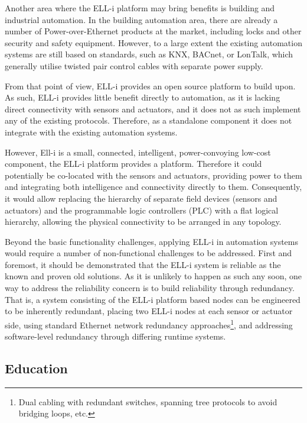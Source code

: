 \documentclass[draft,a4paper]{siamltex}
\begin{document}
Another area where the ELL-i platform may bring benefits is building
and industrial automation.  In the building automation area, there are
already a number of Power-over-Ethernet products at the market,
including locks and other security and safety equipment.  However, to
a large extent the existing automation systems are still based on
standards, such as KNX\cite{KNX}, BACnet\cite{BACnet}, or
LonTalk\cite{LonTalk}, which generally utilise twisted pair
control cables with separate power supply.

From that point of view, ELL-i provides an open source platform to
build upon.  As such, ELL-i provides little benefit directly to
automation, as it is lacking direct connectivity with sensors and
actuators, and it does not as such implement any of the existing
protocols.  Therefore, as a standalone component it does not integrate
with the existing automation systems.

However, Ell-i is a small, connected, intelligent, power-convoying low-cost
component, the ELL-i platform provides a platform.  Therefore it could
potentially be co-located with the sensors and actuators, providing
power to them and integrating both intelligence and connectivity
directly to them.  Consequently, it would allow replacing the
hierarchy of separate field devices (sensors and actuators) and the
programmable logic controllers (PLC) with a flat logical hierarchy,
allowing the physical connectivity to be arranged in any topology.

Beyond the basic functionality challenges, applying ELL-i in
automation systems would require a number of non-functional challenges
to be addressed.  First and foremost, it should be demonstrated that
the ELL-i system is reliable as the known and proven old solutions.
As it is unlikely to happen as such any soon, one way to address the
reliability concern is to build reliability through redundancy.  That
is, a system consisting of the ELL-i platform based nodes can be
engineered to be inherently redundant, placing two ELL-i nodes at each
sensor or actuator side, using standard Ethernet network redundancy
approaches\footnote{Dual cabling with redundant switches, spanning
  tree protocols to avoid bridging loops, etc.}, and addressing
software-level redundancy through differing runtime systems.

\subsection{Education}
\end{document}
